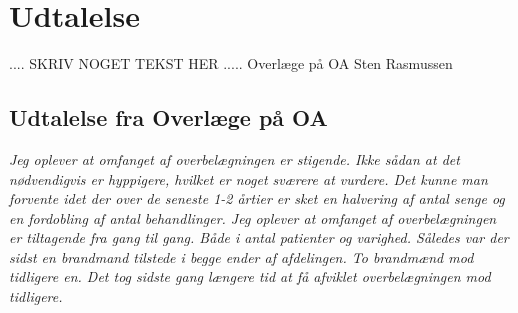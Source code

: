 \chapter{Udtalelse}
.... SKRIV NOGET TEKST HER .....
Overlæge på OA Sten Rasmussen 
\section{Udtalelse fra Overlæge på OA}
\textit{Jeg oplever at omfanget af overbelægningen er stigende. Ikke sådan at det nødvendigvis er hyppigere, hvilket er noget sværere at vurdere. Det kunne man forvente idet der over de seneste 1-2 årtier er sket en halvering af antal senge og en fordobling af antal behandlinger.
Jeg oplever at omfanget af overbelægningen er tiltagende fra gang til gang. Både i antal patienter og varighed. Således var der sidst en brandmand tilstede i begge ender af afdelingen. To brandmænd mod tidligere en. Det tog sidste gang længere tid at få afviklet overbelægningen mod tidligere.}